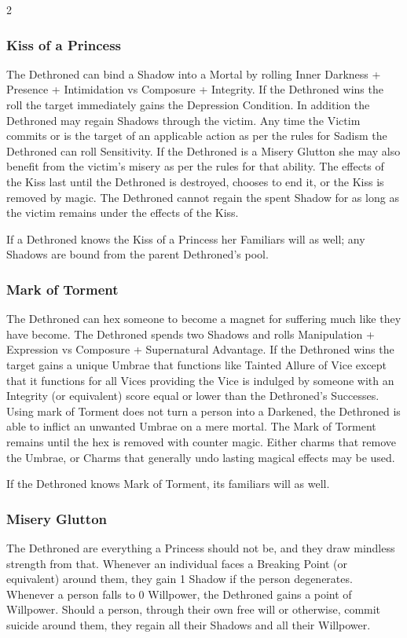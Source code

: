 \begin{multicols}{2}
\subsubsection*{Kiss of a Princess}

The Dethroned can bind a Shadow into a Mortal by rolling Inner Darkness + Presence + Intimidation vs Composure + Integrity. If the Dethroned wins the roll the target immediately gains the Depression Condition. In addition the Dethroned may regain Shadows through the victim. Any time the Victim commits or is the target of an applicable action as per the rules for Sadism the Dethroned can roll Sensitivity. If the Dethroned is a Misery Glutton she may also benefit from the victim's misery as per the rules for that ability. The effects of the Kiss last until the Dethroned is destroyed, chooses to end it, or the Kiss is removed by magic. The Dethroned cannot regain the spent Shadow for as long as the victim remains under the effects of the Kiss.

If a Dethroned knows the Kiss of a Princess her Familiars will as well; any Shadows are bound from the parent Dethroned's pool.

\subsubsection*{Mark of Torment}

The Dethroned can hex someone to become a magnet for suffering much like they have become. The Dethroned spends two Shadows and rolls Manipulation + Expression vs Composure + Supernatural Advantage. If the Dethroned wins the target gains a unique Umbrae that functions like Tainted Allure of Vice except that it functions for all Vices providing the Vice is indulged by someone with an Integrity (or equivalent) score equal or lower than the Dethroned's Successes. Using mark of Torment does not turn a person into a Darkened, the Dethroned is able to inflict an unwanted Umbrae on a mere mortal. The Mark of Torment remains until the hex is removed with counter magic. Either charms that remove the Umbrae, or Charms that generally undo lasting magical effects may be used.

If the Dethroned knows Mark of Torment, its familiars will as well.

\subsubsection*{Misery Glutton}

The Dethroned are everything a Princess should not be, and they draw mindless strength from that. Whenever an individual faces a Breaking Point (or equivalent) around them, they gain 1 Shadow if the person degenerates. Whenever a person falls to 0 Willpower, the Dethroned gains a point of Willpower. Should a person, through their own free will or otherwise, commit suicide around them, they regain all their Shadows and all their Willpower.


\end{multicols}
